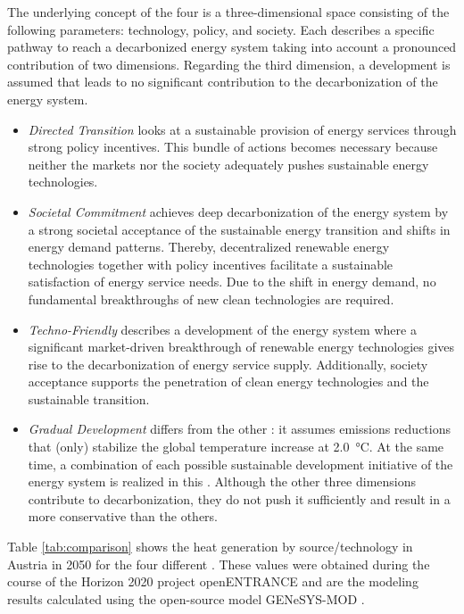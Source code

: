 The underlying concept of the four  is a three-dimensional space consisting of the following parameters: technology, policy, and society. Each  describes a specific pathway to reach a decarbonized energy system taking into account a pronounced contribution of two dimensions. Regarding the third dimension, a development is assumed that leads to no significant contribution to the decarbonization of the energy system. 

\begin{itemize}
	\item \textit{Directed Transition} looks at a sustainable provision of energy services through strong policy incentives. This bundle of actions becomes necessary because neither the markets nor the society adequately pushes sustainable energy technologies.
	\item \textit{Societal Commitment} achieves deep decarbonization of the energy system by a strong societal acceptance of the sustainable energy transition and shifts in energy demand patterns. Thereby, decentralized renewable energy technologies together with policy incentives facilitate a sustainable satisfaction of energy service needs. Due to the shift in energy demand, no fundamental breakthroughs of new clean technologies are required.
	\item \textit{Techno-Friendly} describes a development of the energy system where a significant market-driven breakthrough of renewable energy technologies gives rise to the decarbonization of energy service supply. Additionally, society acceptance supports the penetration of clean energy technologies and the sustainable transition.
	\item \textit{Gradual Development} differs from the other : it assumes emissions reductions that (only) stabilize the global temperature increase at \SI{2.0}{\degreeCelsius}. At the same time, a combination of each possible sustainable development initiative of the energy system is realized in this . Although the other three dimensions contribute to decarbonization, they do not push it sufficiently and result in a more conservative  than the others.
\end{itemize}

Table \ref{tab:comparison} shows the heat generation by source/technology in Austria in 2050 for the four different . These values were obtained during the course of the Horizon 2020 project openENTRANCE and are the modeling results calculated using the open-source model GENeSYS-MOD \cite{burandt2018genesys}. 

